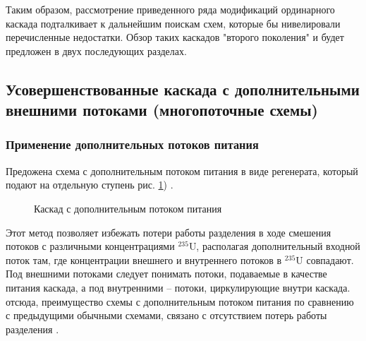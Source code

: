 Таким образом, рассмотрение приведенного ряда модификаций ординарного каскада подталкивает к дальнейшим поискам схем, которые бы нивелировали перечисленные недостатки.
Обзор таких каскадов "второго поколения" и будет предложен в двух последующих разделах.

\subsection{Усовершенствованные каскада с дополнительными внешними потоками (многопоточные схемы)}

\subsubsection{Применение дополнительных потоков питания}

Предожена схема с дополнительным потоком питания в виде регенерата, который подают на отдельную ступень рис. \ref{fig:2_inputs}) \cite{sulaberidzeQuasiidealCascadesAdditional2006}.
\begin{figure}[ht]
  \caption{Каскад с дополнительным потоком питания}\label{fig:2_inputs}
\end{figure}

Этот метод позволяет избежать потери работы разделения в ходе смешения потоков с различными концентрациями $^{235}$U, располагая дополнительный входной поток там, где концентрации внешнего и внутреннего потоков в $^{235}$U совпадают. Под внешними потоками следует понимать потоки, подаваемые в качестве питания каскада, а под внутренними -- потоки, циркулирующие внутри каскада. отсюда, преимущество схемы с дополнительным потоком питания по сравнению с предыдущими обычными схемами, связано с отсутствием потерь работы разделения \cite{smirnovKaskadnyeShemyZadachah2012, sulaberidzeQuasiidealCascadesAdditional2006}.


